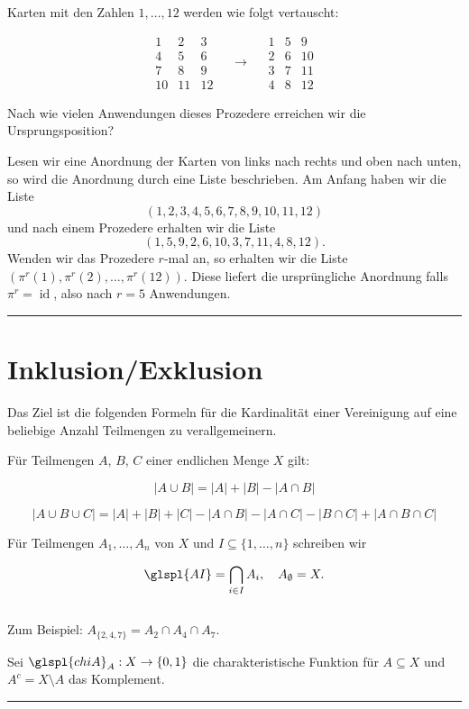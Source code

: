 \documentclass[9pt]{article}
\begin{document}
\begin{bsp}
Karten mit den Zahlen $1, \dots, 12$ werden wie folgt vertauscht:

\[
\begin{array}{ccc}
1 & 2 & 3 \\
4 & 5 & 6 \\
7 & 8 & 9 \\
10 & 11 & 12
\end{array}
\quad \longrightarrow \quad
\begin{array}{ccc}
1 & 5 & 9 \\
2 & 6 & 10 \\
3 & 7 & 11 \\
4 & 8 & 12
\end{array}
\]

Nach wie vielen Anwendungen dieses Prozedere erreichen wir die Ursprungsposition?

Lesen wir eine Anordnung der Karten von links nach rechts und oben nach unten, so wird die Anordnung durch eine Liste beschrieben. Am Anfang haben wir die Liste
\[
(1, 2, 3, 4, 5, 6, 7, 8, 9, 10, 11, 12)
\]
und nach einem Prozedere erhalten wir die Liste
\[
(1, 5, 9, 2, 6, 10, 3, 7, 11, 4, 8, 12).
\]
Wenden wir das Prozedere $r$-mal an, so erhalten wir die Liste $(\pi^r(1), \pi^r(2), \dots, \pi^r(12))$. Diese liefert die ursprüngliche Anordnung falls $\pi^r = \operatorname{id}$, also nach $r = 5$ Anwendungen.

\end{bsp} \noindent \rule{8cm}{0.4pt}

\section{Inklusion/Exklusion}
Das Ziel ist die folgenden Formeln für die Kardinalität einer Vereinigung auf
eine beliebige Anzahl Teilmengen zu verallgemeinern.

\begin{bsp} \label{beispiel4-1}
Für Teilmengen \( A \), \( B \), \( C \) einer endlichen Menge \( X \) gilt:

\[
|A \cup B| = |A| + |B| - |A \cap B|
\]

\[
|A \cup B \cup C| = |A| + |B| + |C| - |A \cap B| - |A \cap C| - |B \cap C| + |A \cap B \cap C|
\]

Für Teilmengen \( A_1, \dots, A_n \) von \( X \) und \( I \subseteq \{1, \dots, n\} \) schreiben wir

\[
\glspl{AI} = \bigcap_{i \in I} A_i, \quad A_{\emptyset} = X.
\]
\\
Zum Beispiel: \( A_{\{2,4,7\}} = A_2 \cap A_4 \cap A_7 \).

Sei \( \glspl{chiA}_A: X \to \{0,1\} \) die charakteristische Funktion für \( A \subseteq X \) und \( A^c = X \setminus A \) das Komplement.
\end{bsp} \noindent \rule{8cm}{0.4pt}
\end{document}
